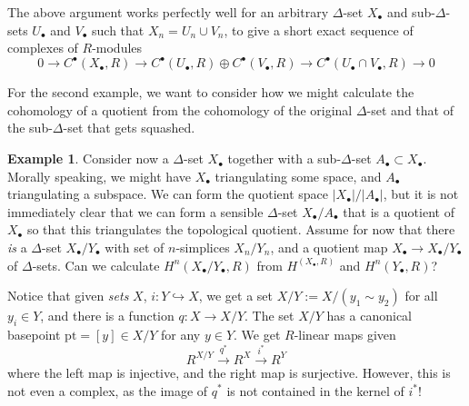 \documentclass{tufte-handout}
\def\pt {\mathrm{pt}}
\theoremstyle{definition}
\newtheorem{example}{Example}
\begin{document}
The above argument works perfectly well for an arbitrary $\Delta$-set $X_\bullet$ and 
sub-$\Delta$-sets $U_\bullet$ and $V_\bullet$ such that $X_n = U_n \cup V_n$, to give a short
exact sequence of complexes of $R$-modules
\[
0\to C^\bullet(X_\bullet,R) \to C^\bullet(U_\bullet,R) \oplus C^\bullet(V_\bullet,R) \to C^\bullet(U_\bullet\cap V_\bullet,R) \to 0
\]

For the second example, we want to consider how we might calculate the cohomology of a quotient
from the cohomology of the original $\Delta$-set and that of the sub-$\Delta$-set that gets squashed.

\begin{example}
Consider now a $\Delta$-set $X_\bullet$ together with a sub-$\Delta$-set $A_\bullet \subset X_\bullet$.
Morally speaking, we might have $X_\bullet$ triangulating some space, and $A_\bullet$ triangulating
a subspace. We can form the quotient space $|X_\bullet|/|A_\bullet|$, but it is not immediately clear that
we can form a sensible $\Delta$-set $X_\bullet/A_\bullet$ that is a quotient of $X_\bullet$ so 
that this triangulates the topological quotient. Assume for now that there \emph{is} a $\Delta$-set
$X_\bullet/Y_\bullet$ with set of $n$-simplices $X_n/Y_n$, and a quotient map $X_\bullet\to X_\bullet/Y_\bullet$ of $\Delta$-sets.
Can we calculate $H^n(X_\bullet/Y_\bullet,R)$ from $H^(X_\bullet,R)$ and $H^n(Y_\bullet,R)$?

Notice that given \emph{sets} $X$, $i\colon Y\hookrightarrow X$, we get a set $X/Y := X/(y_1\sim y_2)$ for all $y_i\in Y$,
and there is a function $q\colon X\to X/Y$. The set $X/Y$ has a canonical basepoint $\pt = [y]\in X/Y$ for any $y\in Y$.
We get $R$-linear maps given 
\[
	R^{X/Y} \xrightarrow{q^*} R^X \xrightarrow{i^*} R^Y 
\]
where the left map is injective, and the right map is surjective. However, this is not even a complex,
as the image of $q^*$ is not contained in the kernel of $i^*$!
\end{example}
\end{document}
